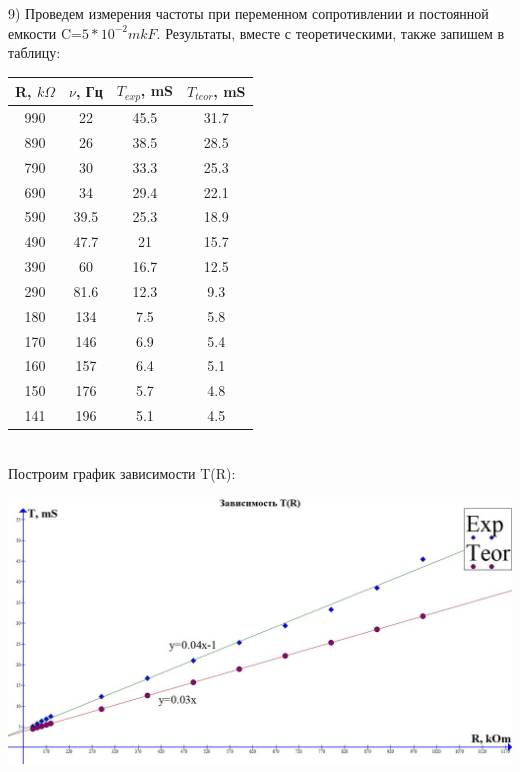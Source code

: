 \documentclass[a4paper,12pt]{article} %
\begin{document}
9) Проведем измерения частоты при переменном сопротивлении и постоянной емкости C=$5*10^{-2}  mkF$. Результаты, вместе с теоретическими, также запишем в таблицу: \\
\begin{tabular}{|c|c|c|c|}
\hline 
R, $k\Omega$ & $\nu$, Гц  & $T_{exp}$, mS & $T_{teor}$, mS \\ 
\hline 
990 & 22 & 45.5 & 31.7 \\ 
\hline 
890 & 26 & 38.5 & 28.5 \\ 
\hline 
790 & 30 & 33.3 & 25.3 \\ 
\hline 
690 & 34 & 29.4 & 22.1 \\ 
\hline 
590 & 39.5 & 25.3 & 18.9 \\ 
\hline 
490 & 47.7 & 21 & 15.7 \\ 
\hline 
390 & 60 & 16.7 & 12.5 \\ 
\hline 
290 & 81.6 & 12.3 & 9.3 \\ 
\hline 
180 & 134 & 7.5 & 5.8 \\ 
\hline 
170 & 146 & 6.9 & 5.4 \\ 
\hline 
160 & 157 & 6.4 & 5.1 \\ 
\hline 
150 & 176 & 5.7 & 4.8 \\ 
\hline 
141 & 196 & 5.1 & 4.5 \\ 
\hline 
\end{tabular} 
\\
Построим график зависимости T(R): \\
\begin{center}
\includegraphics[scale=0.3]{3533}
\end{center}
\end{document}

